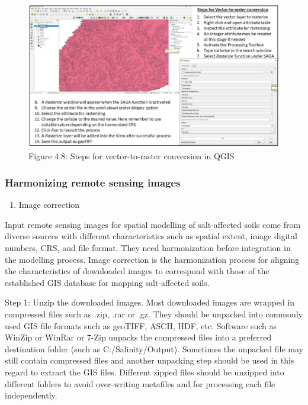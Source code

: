 \documentclass[
  10pt,
  b5paper,
]{book}
\providecommand{\tightlist}{%
  \setlength{\itemsep}{0pt}\setlength{\parskip}{0pt}}
\begin{document}
\begin{figure}
\centering
\includegraphics{figures/images/Figure4.8.PNG}
\caption{Figure 4.8: Steps for vector-to-raster conversion in QGIS}
\end{figure}

\hypertarget{harmonizing-remote-sensing-images}{%
\subsubsection{Harmonizing remote sensing images}\label{harmonizing-remote-sensing-images}}

\begin{enumerate}
\def\labelenumi{(\arabic{enumi})}
\tightlist
\item
  Image correction
\end{enumerate}

Input remote sensing images for spatial modelling of salt-affected soils come from diverse sources with different characteristics such as spatial extent, image digital numbers, CRS, and file format. They need harmonization before integration in the modelling process. Image correction is the harmonization process for aligning the characteristics of downloaded images to correspond with those of the established GIS database for mapping salt-affected soils.

Step 1: Unzip the downloaded images.
Most downloaded images are wrapped in compressed files such as .zip, .rar or .gz. They should be unpacked into commonly used GIS file formats such as geoTIFF, ASCII, HDF, etc. Software such as WinZip or WinRar or 7-Zip unpacks the compressed files into a preferred destination folder (such as C:/Salinity/Output). Sometimes the unpacked file may still contain compressed files and another unpacking step should be used in this regard to extract the GIS files. Different zipped files should be unzipped into different folders to avoid over-writing metafiles and for processing each file independently.
\end{document}
